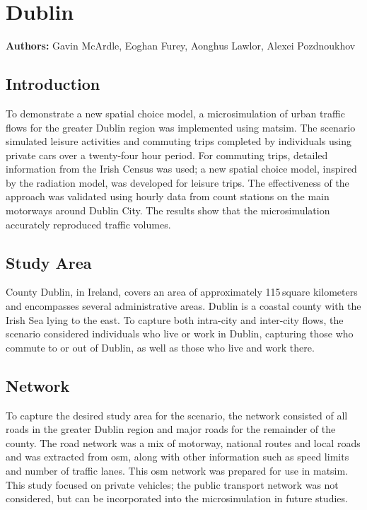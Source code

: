 \chapter{Dublin}
\label{ch:dublin}
\hfill \textbf{Authors:} Gavin McArdle, Eoghan Furey, Aonghus Lawlor, Alexei Pozdnoukhov


\section{Introduction}
To demonstrate a new spatial choice model, a \gls{microsimulation} of urban traffic flows for the greater Dublin region was implemented using \gls{matsim}. The scenario simulated leisure activities and commuting trips completed by individuals using private cars over a twenty-four hour period. For commuting trips, detailed information from the Irish Census was used; a new spatial choice model, inspired by the radiation model, was developed for leisure trips. The effectiveness of the approach was validated using hourly data from count stations on the main motorways around Dublin City. The results show that the \gls{microsimulation} accurately reproduced traffic volumes.

\section{Study Area}
County Dublin, in Ireland, covers an area of approximately 115\,square kilometers and encompasses several administrative areas. Dublin is a coastal county with the Irish Sea lying to the east. To capture both intra-city and inter-city flows, the scenario considered individuals who live or work in Dublin, capturing those who commute to or out of Dublin, as well as those who live and work there.

\section{Network}
To capture the desired study area for the scenario, the network consisted of all roads in the greater Dublin region and major roads for the remainder of the county. The road network was a mix of motorway, national routes and local roads and was extracted from \gls{osm}, along with other information such as speed limits and number of traffic lanes. This \gls{osm} network was prepared for use in \gls{matsim}.  This study focused on private vehicles; the public transport network was not considered, but can be incorporated into the \gls{microsimulation} in future studies.

